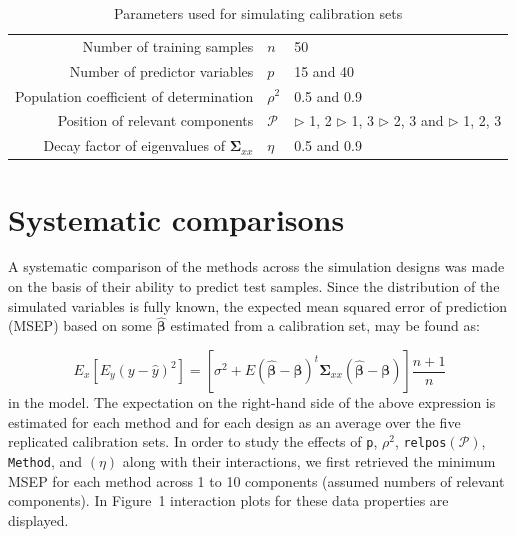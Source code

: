\documentclass[num-refs]{wiley-article}
\begin{document}
\begin{table}[!ht]
\centering
\caption{Parameters used for simulating calibration sets}
\label{tab:parameters}
\begin{tabular}{rll}
Number of training samples              & $n$      & 50                \\
Number of predictor variables           & $p$      & 15 and 40         \\
Population coefficient of determination & $\rho^2$ & 0.5 and 0.9       \\
Position of relevant components         & $\mathcal{P}$
  & $\triangleright$ 1, 2 \;
  $\triangleright$ 1,  3 \; \newline
  $\triangleright$ 2,  3 and \;
  $\triangleright$ 1,  2, 3 \\
Decay factor of eigenvalues of $\boldsymbol{\Sigma}_{xx}$        & $\eta$   & 0.5 and 0.9
\end{tabular}
\end{table}

\section{Systematic comparisons}

A systematic comparison of the methods across the simulation designs was made on the basis of their ability to predict test samples. Since the distribution of the simulated variables is fully known, the expected mean squared error of prediction (MSEP) based on some $\hat{\bm{\beta}}$ estimated from a calibration set, may be found as:

\begin{equation}
  E_x\left[E_y\left(y - \hat{y}\right)^2\right] =
  \left[\sigma^2 + E\left(\hat{\bm{\beta}} - \bm{\beta}\right)^t\bm{\Sigma}_{xx}\left(\hat{\bm{\beta}} - \bm{\beta}\right)\right]\frac{n+1}{n}
  \label{EE}
\end{equation}
in the model. The expectation on the right-hand side of the above expression is estimated for each method and for each design as an average over the five replicated calibration sets. In order to study the effects of {\tt p}, $\rho^2$, {\tt relpos}$(\mathcal{P})$, {\tt Method}, and $(\eta)$ along with their interactions, we first retrieved the minimum MSEP for each method across 1 to 10 components (assumed numbers of relevant components). In Figure~1 interaction plots for these data properties are displayed.

\end{document}
